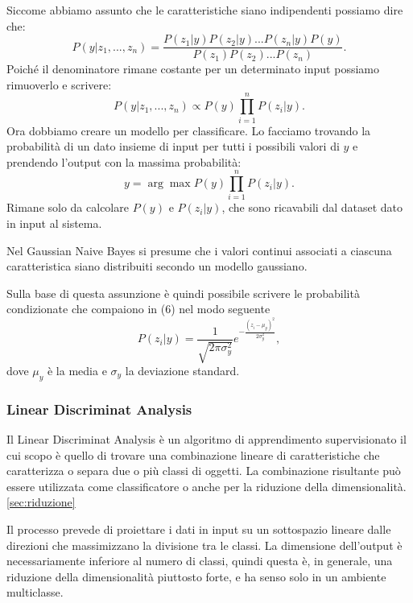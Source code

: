 \documentclass[12pt,italian]{report}
\begin{document}
Siccome abbiamo assunto che le caratteristiche siano indipendenti possiamo dire che:
\begin{equation}
P(y| z_1,..., z_n) = \frac{P(z_1|y) P(z_2|y)...P(z_n|y)P(y)}{P(z_1)P(z_2)...P(z_n)}.
\end{equation}
Poiché il denominatore rimane costante per un determinato input possiamo rimuoverlo e scrivere:
\begin{equation}
P(y| z_1,..., z_n) \propto P(y) \prod_{i=1}^{n} P(z_i|y).
\end{equation}
Ora dobbiamo creare un modello per classificare. Lo facciamo trovando la probabilità di un dato insieme di input per tutti i possibili valori di $y$ e prendendo l'output con la massima probabilità:
\begin{equation}
y = \arg\max P(y) \prod_{i=1}^{n} P(z_i|y).
\end{equation}
Rimane solo da calcolare $P(y)$ e $P(z_i|y)$, che sono ricavabili dal dataset dato in input al sistema.

Nel Gaussian Naive Bayes si presume che i valori continui associati a ciascuna caratteristica siano distribuiti secondo un modello gaussiano. 

Sulla base di questa assunzione è quindi possibile scrivere le probabilità condizionate che compaiono in (6) nel modo seguente
\begin{equation}
P(z_i|y) = \frac{1}{\sqrt{2\pi \sigma_y^2}} e^{-\frac{(z_i-\mu_y)^2}{2\sigma_y^2}},
\end{equation}
dove $\mu_y$ è la media e $\sigma_y$ la deviazione standard.
\subsubsection{Linear Discriminat Analysis}
Il Linear Discriminat Analysis è un algoritmo di apprendimento supervisionato il cui scopo è quello di trovare una combinazione lineare di caratteristiche che caratterizza o separa due o più classi di oggetti. La combinazione risultante può essere utilizzata come classificatore o anche per la riduzione della dimensionalità. \ref{sec:riduzione}

Il processo prevede di proiettare i dati in input su un sottospazio lineare dalle direzioni che massimizzano la divisione tra le classi. La dimensione dell'output è necessariamente inferiore al numero di classi, quindi questa è, in generale, una riduzione della dimensionalità piuttosto forte, e ha senso solo in un ambiente multiclasse.

\end{document}
